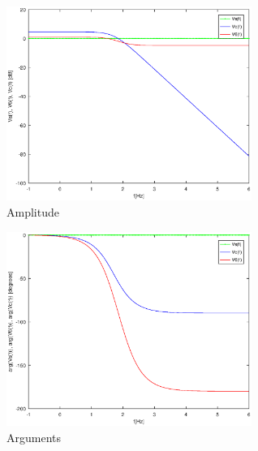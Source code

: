 \begin{figure}[H]
\centering
\includegraphics[width = 8cm]{Amplitude.eps}
\caption {Amplitude}
\end{figure}

\begin{figure}[H]
\centering
\includegraphics[width = 8cm]{Arguments.eps}
\caption {Arguments}
\end{figure}
